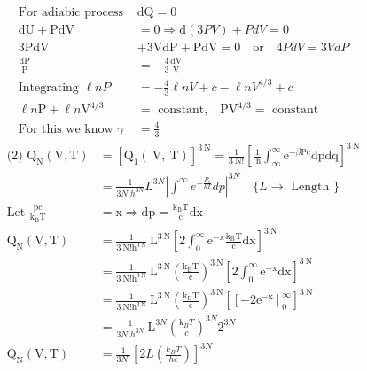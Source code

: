 \begin{enumerate}
\begin{answer}
\begin{align*}
\text{For adiabic process }&\mathrm{dQ}=0\\
\mathrm{dU}+\mathrm{PdV}&=0 \Rightarrow \mathrm{d}(3PV)+PdV=0\\
3 \mathrm{PdV}&+3 \mathrm{VdP}+\mathrm{PdV}=0 \quad \text{or} \quad 4PdV=3VdP\\
\frac{\mathrm{dP}}{\mathrm{P}}&=-\frac{4}{3} \frac{\mathrm{dV}}{\mathrm{V}}\\
\text{Integrating }\ell nP&=-\frac{4}{3} \ell n V+c-\ell n V^{4 / 3}+c\\
\ell n\mathrm{P}+\ell n \mathrm{V}^{4 / 3}&=\text{ constant,}\quad \mathrm{PV}^{4 / 3}= \text{ constant}\\
\text{For this we know }\gamma&=\frac{4}{3}
		\end{align*}
		\begin{align*}
		\text{(2) }\mathrm{Q}_{\mathrm{N}}(\mathrm{V}, \mathrm{T})&=\left[\mathrm{Q}_{1}(\mathrm{~V}, \mathrm{~T})\right]^{3 \mathrm{~N}}=\frac{1}{3 \mathrm{~N} !}\left[\frac{1}{\mathrm{~h}} \int_{\infty}^{\infty} \mathrm{e}^{-\beta \mathrm{Pc}} \mathrm{dp} \mathrm{dq}\right]^{3 \mathrm{~N}}\\
		&=\frac{1}{3 N ! h^{3 N}} L^{3 N}\left|\int^{\infty} e^{-\frac{P_{c}}{k T}} d p\right|^{3 N} \quad\{L \rightarrow\text{ Length }\}\\
		\text{Let }\frac{\mathrm{pc}}{\mathrm{k}_{\mathrm{B}} \mathrm{T}}&=\mathrm{x} \Rightarrow \mathrm{dp}=\frac{\mathrm{k}_{\mathrm{B}} \mathrm{T}}{\mathrm{c}} \mathrm{dx}\\
		 \mathrm{Q}_{\mathrm{N}}(\mathrm{V}, \mathrm{T}) &=\frac{1}{3 \mathrm{~N} ! \mathrm{h}^{3 \mathrm{~N}}} \mathrm{~L}^{3 \mathrm{~N}}\left[2 \int_{0}^{\infty} \mathrm{e}^{-\mathrm{x}} \frac{\mathrm{k}_{\mathrm{B}} \mathrm{T}}{\mathrm{c}} \mathrm{dx}\right]^{3 \mathrm{~N}} \\
		  &=\frac{1}{3 \mathrm{~N} ! \mathrm{h}^{3 \mathrm{~N}}} \mathrm{~L}^{3 \mathrm{~N}}\left(\frac{\mathrm{k}_{\mathrm{B}} \mathrm{T}}{\mathrm{c}}\right)^{3 \mathrm{~N}}\left[2 \int_{0}^{\infty} \mathrm{e}^{-\mathrm{x}} \mathrm{dx}\right]^{3 \mathrm{~N}} \\
		  &=\frac{1}{3 \mathrm{~N} ! \mathrm{h}^{3 \mathrm{~N}}} \mathrm{~L}^{3 \mathrm{~N}}\left(\frac{\mathrm{k}_{\mathrm{B}} \mathrm{T}}{\mathrm{c}}\right)^{3 \mathrm{~N}}\left[\left[-2 \mathrm{e}^{-\mathrm{x}}\right]_{0}^{\infty}\right]^{3 \mathrm{~N}}\\
		  &=\frac{1}{3 N ! h^{3 N}} \mathrm{~L}^{3 N}\left(\frac{\mathrm{k}_{B} T}{c}\right)^{3 N}2^{3 N}\\
		  \mathrm{Q}_{\mathrm{N}}(\mathrm{V}, \mathrm{T})&=\frac{1}{3N!}\left[ 2L \left( \frac{k_B T}{hc}\right) \right] ^{3N}
		\end{align*}
	\end{answer}
\end{enumerate}

